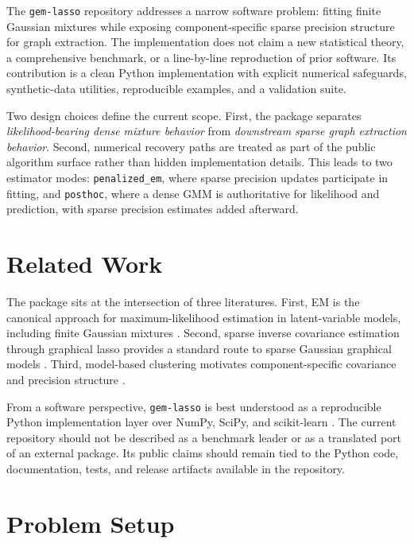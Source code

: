 \documentclass[10pt]{article}
\begin{document}
The \texttt{gem-lasso} repository addresses a narrow software problem: fitting
finite Gaussian mixtures while exposing component-specific sparse precision
structure for graph extraction. The implementation does not claim a new
statistical theory, a comprehensive benchmark, or a line-by-line reproduction of
prior software. Its contribution is a clean Python implementation with explicit
numerical safeguards, synthetic-data utilities, reproducible examples, and a
validation suite.

Two design choices define the current scope. First, the package separates
\emph{likelihood-bearing dense mixture behavior} from \emph{downstream sparse
graph extraction behavior}. Second, numerical recovery paths are treated as
part of the public algorithm surface rather than hidden implementation details.
This leads to two estimator modes: \texttt{penalized\_em}, where sparse
precision updates participate in fitting, and \texttt{posthoc}, where a dense
GMM is authoritative for likelihood and prediction, with sparse precision
estimates added afterward.

\section{Related Work}

The package sits at the intersection of three literatures. First, EM is the
canonical approach for maximum-likelihood estimation in latent-variable models,
including finite Gaussian mixtures \citep{TODO_em_algorithm,TODO_gmm_source}.
Second, sparse inverse covariance estimation through graphical lasso provides a
standard route to sparse Gaussian graphical models
\citep{TODO_graphical_lasso}. Third, model-based clustering motivates
component-specific covariance and precision structure
\citep{TODO_model_based_clustering,TODO_sparse_mixture_source}.

From a software perspective, \texttt{gem-lasso} is best understood as a
reproducible Python implementation layer over NumPy, SciPy, and scikit-learn
\citep{TODO_sklearn_source}. The current repository should not be described as
a benchmark leader or as a translated port of an external package. Its public
claims should remain tied to the Python code, documentation, tests, and release
artifacts available in the repository.


\section{Problem Setup}
\end{document}
